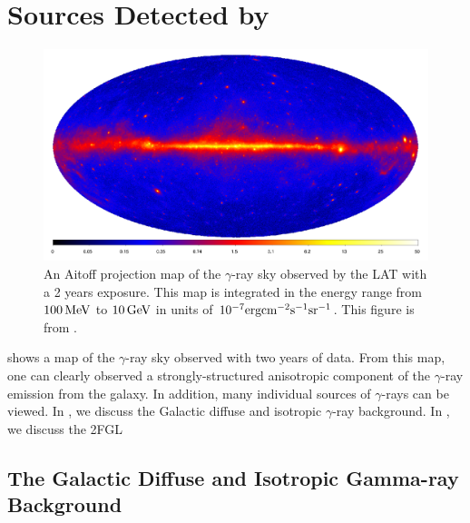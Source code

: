 
\section{Sources Detected by }



\begin{figure}[htbp]
  \centering
    \includegraphics[width=\textwidth]{chapters/introduction/figures/lat_skymap_2fgl.pdf}
  \caption{
  An Aitoff projection map of the $\gamma$-ray sky observed by the
  \ac{LAT} with a 2 years exposure.  This map is integrated in the
  energy range from $100\,\text{MeV}$ to $10\,\text{GeV}$ in units
  of $10^{-7}\text{erg}\text{cm}^{-2}\text{s}^{-1}\text{sr}^{-1}$.  This figure is
  from \cite{nolan_2012_fermi-large}.
  }
\end{figure}

 shows a map of the $\gamma$-ray sky observed
with two years of data. From this map, one can clearly observed a
strongly-structured anisotropic component of the $\gamma$-ray emission
from the galaxy. In addition, many individual sources of $\gamma$-rays
can be viewed. In
, we discuss the Galactic
diffuse and isotropic $\gamma$-ray background. In
, we discuss the \ac{2FGL}
\subsecref{2pc}


\subsection{The Galactic Diffuse and Isotropic Gamma-ray Background}


